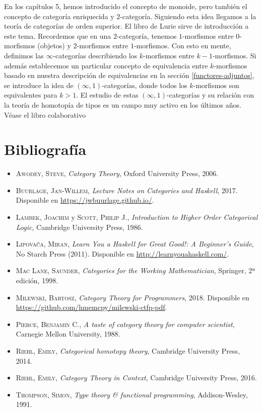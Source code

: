 \documentclass[12pt, twoside]{book}
\begin{document}
En los capítulos 5, hemos introducido el concepto de monoide, pero también el concepto de categoría enriquecida y $2$-categoría.
Siguiendo esta idea llegamos a la teoría de categorías de orden superior. El libro de Lurie sirve de introducción a este tema.
Recordemos que en una $2$-categoría, tenemos $1$-morfismos entre $0$-morfismos (objetos) y $2$-morfismos entre $1$-morfismos.
Con esto en mente, definimos las $\infty$-categorías describiendo los $k$-morfismos entre $k-1$-morfismos.
Si además establecemos un particular concepto de equivalencia entre $k$-morfismos basado en nuestra descripción de equivalencias en la sección \ref{functores-adjuntos}, se introduce la idea de $(\infty,1)$-categorías, donde todos los $k$-morfismos son equivalentes para $k > 1$.
El estudio de estas $(\infty,1)$-categorías y su relación con la teoría de homotopía de tipos es un campo muy activo en los últimos años.
Véase el libro colaborativo 

\backmatter

\chapter*{Bibliografía}
%
%

\begin{itemize}
  \setlength\itemsep{1em}
  \item \textsc{Awodey, Steve}, \emph{Category Theory}, Oxford University Press, 2006.
  \item \textsc{Buurlage, Jan-Willem}, \emph{Lecture Notes on Categories and Haskell}, 2017. Disponible en \url{https://jwbuurlage.github.io/}.
  \item \textsc{Lambek, Joachim} y \textsc{Scott, Philip J.}, \emph{Introduction to Higher Order Categorical Logic}, Cambridge University Press, 1986.
  \item \textsc{Lipovača, Miran}, \emph{Learn You a Haskell for Great Good!: A Beginner's Guide}, No Starch Press (2011). Disponible en \url{http://learnyouahaskell.com/}.
  \item \textsc{Mac Lane, Saunder}, \emph{Categories for the Working Mathematician}, Springer, 2ª edición, 1998.
  \item \textsc{Milewski, Bartosz}, \emph{Category Theory for Programmers}, 2018. Disponible en \url{https://github.com/hmemcpy/milewski-ctfp-pdf}.
  \item \textsc{Pierce, Benjamin C.}, \emph{A taste of category theory for computer scientist}, Carnegie Mellon University, 1988.
  \item \textsc{Riehl, Emily}, \emph{Categorical homotopy theory}, Cambridge University Press, 2014.
  \item \textsc{Riehl, Emily}, \emph{Category Theory in Context}, Cambridge University Press, 2016.
  \item \textsc{Thompson, Simon}, \emph{Type theory \& functional programming}, Addison-Wesley, 1991.
\end{itemize}

\printindex
\end{document}
